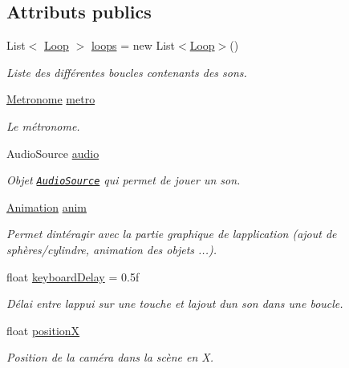 \subsection*{Attributs publics}
\begin{DoxyCompactItemize}
\item 
List$<$ \hyperlink{class_loop}{Loop} $>$ \hyperlink{class_music_abe986f8a412fa868c341d9ba80e95dfd}{loops} = new List$<$\hyperlink{class_loop}{Loop}$>$()
\begin{DoxyCompactList}\small\item\em Liste des différentes boucles contenants des sons. \end{DoxyCompactList}\item 
\hyperlink{class_metronome}{Metronome} \hyperlink{class_music_a64db98945116f90a7af2ef7eec3cf232}{metro}
\begin{DoxyCompactList}\small\item\em Le métronome. \end{DoxyCompactList}\item 
Audio\+Source \hyperlink{class_music_af7e21d12bd49e617d8c66bbd548f658b}{audio}
\begin{DoxyCompactList}\small\item\em Objet \href{http://docs.unity3d.com/ScriptReference/AudioSource.html}{\tt Audio\+Source} qui permet de jouer un son. \end{DoxyCompactList}\item 
\hyperlink{class_animation}{Animation} \hyperlink{class_music_a79bb9b529e228f1a320b47f88ff71d45}{anim}
\begin{DoxyCompactList}\small\item\em Permet d\textquotesingle{}intéragir avec la partie graphique de l\textquotesingle{}application (ajout de sphères/cylindre, animation des objets ...). \end{DoxyCompactList}\item 
float \hyperlink{class_music_a59687d828abbd22accc0fe611026f270}{keyboard\+Delay} = 0.\+5f
\begin{DoxyCompactList}\small\item\em Délai entre l\textquotesingle{}appui sur une touche et l\textquotesingle{}ajout d\textquotesingle{}un son dans une boucle. \end{DoxyCompactList}\item 
float \hyperlink{class_music_a70cf89c5732793d69cce59b44b3e47f4}{position\+X}
\begin{DoxyCompactList}\small\item\em Position de la caméra dans la scène en X. \end{DoxyCompactList}\item 

\end{DoxyCompactItemize}
